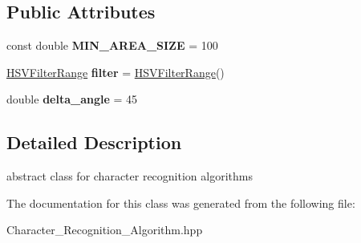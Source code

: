 \subsection*{Public Attributes}
\begin{DoxyCompactItemize}
\item 
\mbox{\label{class_character___recognition___algorithm_a6fda22815d819ef7d0b0cfec4baba47c}} 
const double {\bfseries M\+I\+N\+\_\+\+A\+R\+E\+A\+\_\+\+S\+I\+ZE} = 100
\item 
\mbox{\label{class_character___recognition___algorithm_a3792c162037a2049d991a1634576d915}} 
\mbox{\hyperlink{struct_h_s_v_filter_range}{H\+S\+V\+Filter\+Range}} {\bfseries filter} = \mbox{\hyperlink{struct_h_s_v_filter_range}{H\+S\+V\+Filter\+Range}}()
\item 
\mbox{\label{class_character___recognition___algorithm_a9c22f95223ecc5cfaf8e0303c30d5379}} 
double {\bfseries delta\+\_\+angle} = 45
\end{DoxyCompactItemize}


\subsection{Detailed Description}
abstract class for character recognition algorithms 

The documentation for this class was generated from the following file\+:\begin{DoxyCompactItemize}
\item 
Character\+\_\+\+Recognition\+\_\+\+Algorithm.\+hpp\end{DoxyCompactItemize}
